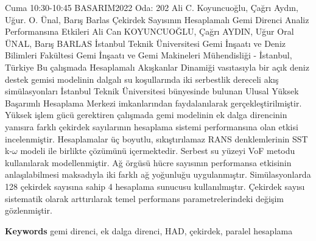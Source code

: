 
    \begin{abstract_basarim}
    {Cuma 10:30-10:45}
    {BASARIM2022}
    {Oda: 202}
    {Ali C. Koyuncuoğlu, Çağrı Aydın, Uğur. O. Ünal, Barış Barlas}
    {Çekirdek Sayısının Hesaplamalı Gemi Direnci Analiz Performansına Etkileri}
    {%
    Ali Can KOYUNCUOĞLU, Çağrı AYDIN, Uğur Oral ÜNAL, Barış BARLAS}
    {%
    }
    {%
    İstanbul Teknik Üniversitesi Gemi İnşaatı ve Deniz Bilimleri Fakültesi Gemi İnşaatı ve Gemi Makineleri Mühendisliği - İstanbul, Türkiye}
    Bu çalışmada Hesaplamalı Akışkanlar Dinamiği vasıtasıyla bir açık deniz destek gemisi modelinin dalgalı su koşullarında iki serbestlik dereceli akış simülasyonları İstanbul Teknik Üniversitesi bünyesinde bulunan Ulusal Yüksek Başarımlı Hesaplama Merkezi imkanlarından faydalanılarak gerçekleştirilmiştir. Yüksek işlem gücü gerektiren çalışmada gemi modelinin ek dalga direncinin yanısıra farklı çekirdek sayılarının hesaplama sistemi performansına olan etkisi incelenmiştir. Hesaplamalar üç boyutlu, sıkıştırılamaz RANS denklemlerinin SST k-$\omega$ modeli ile birlikte çözümünü içermektedir. Serbest su yüzeyi VoF metodu kullanılarak modellenmiştir. Ağ örgüsü hücre sayısının performansa etkisinin anlaşılabilmesi maksadıyla iki farklı ağ yoğunluğu uygulanmıştır. Simülasyonlarda 128 çekirdek sayısına sahip 4 hesaplama sunucusu kullanılmıştır. Çekirdek sayısı sistematik olarak arttırılarak temel performans parametrelerindeki değişim gözlenmiştir. 
    
        \textbf{Keywords} \newline{}gemi direnci, ek dalga direnci, HAD, çekirdek, paralel hesaplama
    \end{abstract_basarim}
    